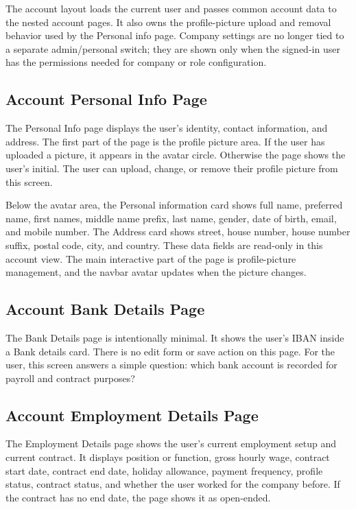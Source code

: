 \documentclass[11pt]{article}
\begin{document}
The account layout loads the current user and passes common account data to the nested account pages. It also owns the profile-picture upload and removal behavior used by the Personal info page. Company settings are no longer tied to a separate admin/personal switch; they are shown only when the signed-in user has the permissions needed for company or role configuration.
\subsection{Account Personal Info Page}

The Personal Info page displays the user's identity, contact information, and address. The first part of the page is the profile picture area. If the user has uploaded a picture, it appears in the avatar circle. Otherwise the page shows the user's initial. The user can upload, change, or remove their profile picture from this screen.

Below the avatar area, the Personal information card shows full name, preferred name, first names, middle name prefix, last name, gender, date of birth, email, and mobile number. The Address card shows street, house number, house number suffix, postal code, city, and country. These data fields are read-only in this account view. The main interactive part of the page is profile-picture management, and the navbar avatar updates when the picture changes.

\subsection{Account Bank Details Page}

The Bank Details page is intentionally minimal. It shows the user's IBAN inside a Bank details card. There is no edit form or save action on this page. For the user, this screen answers a simple question: which bank account is recorded for payroll and contract purposes?

\subsection{Account Employment Details Page}

The Employment Details page shows the user's current employment setup and current contract. It displays position or function, gross hourly wage, contract start date, contract end date, holiday allowance, payment frequency, profile status, contract status, and whether the user worked for the company before. If the contract has no end date, the page shows it as open-ended.
\end{document}

